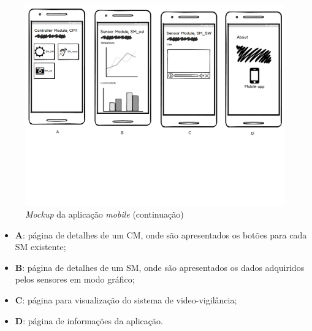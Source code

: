\begin{figure}[h]
	\centering
	\includegraphics[width=\linewidth]{esquemas/mockup/2.pdf}
	\caption{\textit{Mockup} da aplicação \textit{mobile} (continuação)}
	\label{mock2}
\end{figure}

\begin{itemize}
	\item \textbf{A}: página de detalhes de um \acl{CM}, onde são apresentados os botões para cada \acl{SM} existente; 
	\item \textbf{B}: página de detalhes de um \acl{SM}, onde são apresentados os dados adquiridos pelos sensores em modo gráfico; 
	\item \textbf{C}: página para visualização do sistema de video-vigilância; 
	\item \textbf{D}: página de informações da aplicação.
\end{itemize}